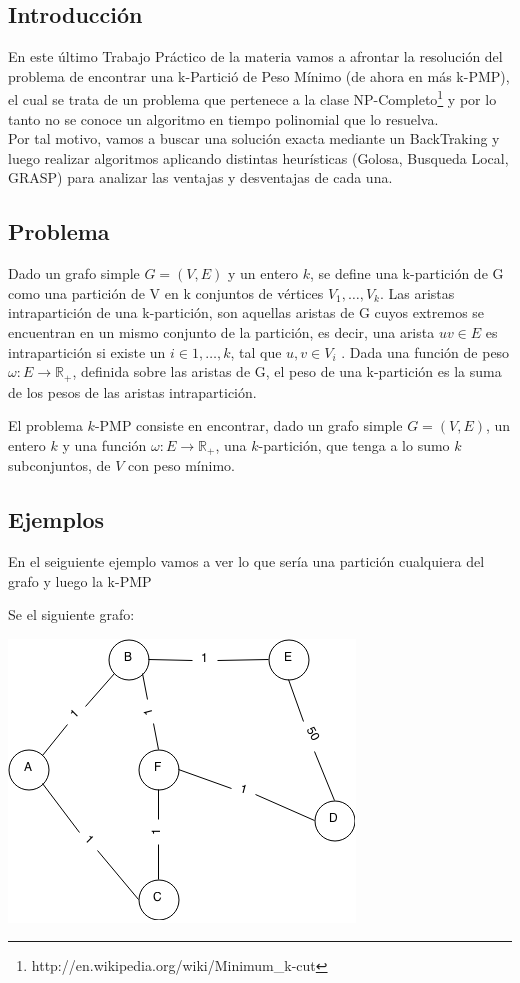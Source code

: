 \subsection{Introducci\'on}
En este \'ultimo Trabajo Pr\'actico de la materia vamos a afrontar la resoluci\'on del problema de encontrar una k-Partici\'o de Peso M\'inimo (de ahora en m\'as k-PMP), el cual se trata de un problema que pertenece a la clase NP-Completo\footnote{http://en.wikipedia.org/wiki/Minimum\_k-cut} y por lo tanto no se conoce un algoritmo en tiempo polinomial que lo resuelva.\\
Por tal motivo, vamos a buscar una soluci\'on exacta mediante un BackTraking y luego realizar algoritmos aplicando distintas heur\'isticas (Golosa, Busqueda Local, GRASP) para analizar las ventajas y desventajas de cada una.

\subsection{Problema}

Dado un grafo simple $G = (V, E)$ y un entero $k$, se define una k-partici\'on de G como una partici\'on de V en k conjuntos de v\'ertices $V_{1} , \ldots , V_{k}$. Las aristas intrapartici\'on de una k-partici\'on, son aquellas aristas de G cuyos extremos se encuentran en un mismo conjunto de la partici\'on, es decir, una arista $uv \in E$ es intrapartici\'on si existe un $i \in {1, \ldots , k}$, tal que $u, v \in V_{i}$ . Dada una función de peso $\omega : E \rightarrow \mathbb{R}_+$, definida sobre las aristas de G, el peso de una k-partici\'on es la suma de los pesos de las aristas intrapartici\'on.

El problema $k$-PMP consiste en encontrar, dado un grafo simple $G = (V, E)$, un entero $k$ y una función $\omega : E \rightarrow \mathbb{R}_+$, una $k$-partición, que tenga a lo sumo $k$ subconjuntos, de $V$ con peso mínimo.

\subsection{Ejemplos}
En el seiguiente ejemplo vamos a ver lo que ser\'ia una partici\'on cualquiera del grafo y luego la k-PMP

Se el siguiente grafo: 

\bc
		\includegraphics[scale=0.5]{img/kpmp.png}
\ec

